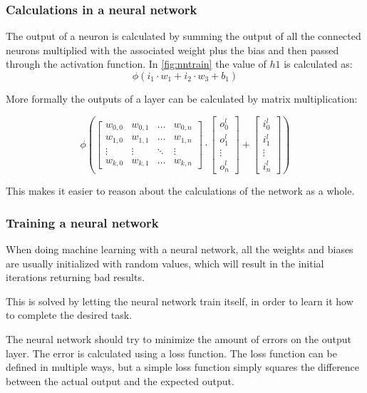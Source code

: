 \subsubsection{Calculations in a neural network}

The output of a neuron is calculated by summing the output of all the connected neurons multiplied with the associated weight plus the bias and then passed through the activation function.
In \autoref{fig:nntrain} the value of $h1 $ is calculated as:
$$\phi(i_1 \cdot w_1 + i_2 \cdot w_3 + b_1)$$


More formally the outputs of a layer can be calculated by matrix multiplication:

$$
\phi\left(
\begin{bmatrix}
w_{0,0} & w_{0,1} & \dots  & w_{0,n} \\
w_{1,0} & w_{1,1} & \dots  & w_{1,n} \\
\vdots & \vdots & \ddots & \vdots \\
w_{k,0} & w_{k,1} & \dots  & w_{k,n}
\end{bmatrix}
\cdot
\begin{bmatrix}
o^l_0\\
o^l_1\\
\vdots \\
o^l_n
\end{bmatrix}
+
\begin{bmatrix}
i^l_0\\
i^l_1\\
\vdots \\
i^l_n
\end{bmatrix}
\right)
$$

This makes it easier to reason about the calculations of the network as a whole.

\subsubsection{Training a neural network}\label{training-a-neural-network}
When doing machine learning with a neural network, all the weights and biases are usually initialized with random values, which will result in the initial iterations returning bad results.

This is solved by letting the neural network train itself, in order to learn it how to complete the desired task.

The neural network should try to minimize the amount of errors on the output layer.
The error is calculated using a loss function.
The loss function can be defined in multiple ways, but a simple loss function simply squares the difference between the actual output and the expected output.

